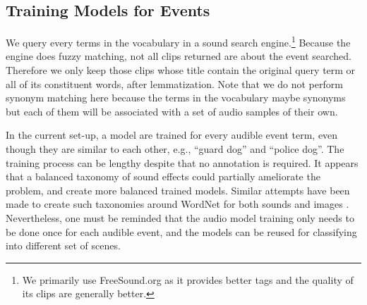 \subsection{Training Models for Events}
\label{sec:collect-audio}
We query every terms in the vocabulary in a sound search
engine.\footnote{We primarily use FreeSound.org as it provides
better tags and the quality of its clips are generally better.}
Because the engine does fuzzy matching,
not all clips returned are about the event searched.
Therefore we only keep those clips whose title contain the original
query term or all of its constituent words, after lemmatization.
Note that we do not perform synonym matching here because the terms
in the vocabulary maybe synonyms but each of them will be associated with
a set of audio samples of their own.

In the current set-up, a model are trained for every audible event term,
even though they are similar to each other, e.g., ``guard dog'' and ``police
dog''. The training process can be lengthy despite that no annotation is
required. It appears that a balanced taxonomy of sound effects could
partially ameliorate the problem, and create more balanced trained models.
Similar attempts have been made to create such taxonomies around
WordNet for both sounds \cite{Cano2004:tax} and images \cite{deng2009imagenet}.
Nevertheless, one must be reminded that the audio model training  only needs
to be done once for each audible event, and the models can be reused
for classifying into different set of scenes.

%
%
%


